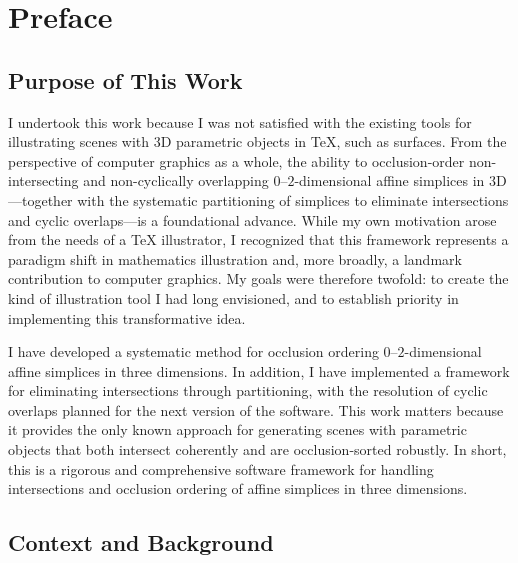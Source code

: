 \chapter*{Preface}

\section*{Purpose of This Work}

I undertook this work because I was not satisfied with the existing
tools for illustrating scenes with \(3\)D parametric objects in
\TeX{}, such as surfaces. From the perspective of computer graphics
as a whole, the ability to occlusion-order non-intersecting and
non-cyclically overlapping \(0\)--\(2\)-dimensional affine simplices
in \(3\)D---together with the systematic partitioning of simplices to
eliminate intersections and cyclic overlaps---is a foundational
advance. While my own motivation arose from the needs of a
\TeX{} illustrator, I recognized that this framework represents a
paradigm shift in mathematics illustration and, more broadly, a
landmark contribution to computer graphics. My goals were therefore
twofold: to create the kind of illustration tool I had long
envisioned, and to establish priority in implementing this
transformative idea.

I have developed a systematic method for occlusion ordering
\(0\)--\(2\)-dimensional affine simplices in three dimensions.
In addition, I have implemented a framework for eliminating
intersections through partitioning, with the resolution of
cyclic overlaps planned for the next version of the software.
This work matters because it provides the only known approach
for generating scenes with parametric objects that both
intersect coherently and are occlusion-sorted robustly. In
short, this is a rigorous and comprehensive software framework
for handling intersections and occlusion ordering of affine
simplices in three dimensions.

\section*{Context and Background}

